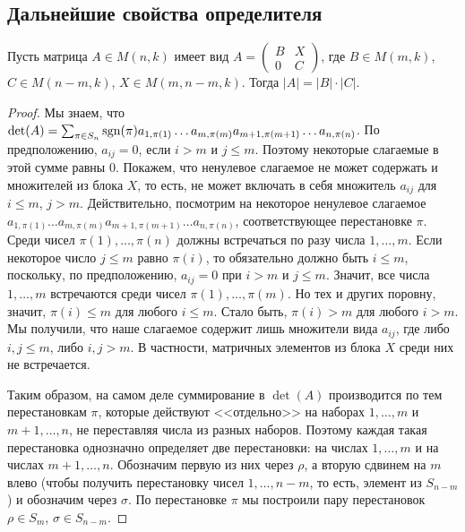 \subsection{Дальнейшие свойства определителя}

\begin{theorem}\label{thm_det_block_ut}
Пусть матрица $A\in M(n,k)$ имеет вид
$A=\begin{pmatrix}B & X\\0 & C\end{pmatrix}$, где
$B\in M(m,k)$, $C\in M(n-m,k)$, $X\in M(m,n-m,k)$. Тогда $|A|=|B|\cdot
|C|$.
\end{theorem}
\begin{proof}
Мы знаем, что $\det(A)=\sum_{\pi\in S_n}\operatorname{sgn}(\pi)a_{1,\pi(1)}\dots a_{m,\pi(m)}
a_{m+1,\pi(m+1)} \dots a_{n,\pi(n)}$.
По предположению, $a_{ij}=0$, если $i>m$ и $j\leq m$. Поэтому
некоторые слагаемые в этой сумме равны $0$. Покажем, что ненулевое
слагаемое не может содержать и множителей из блока $X$, то есть, не
может включать в себя множитель $a_{ij}$ для $i\leq m$, $j>m$.
Действительно, посмотрим на некоторое ненулевое слагаемое
$a_{1,\pi(1)}\dots a_{m,\pi(m)} a_{m+1,\pi(m+1)}\dots a_{n,\pi(n)}$,
соответствующее перестановке $\pi$.
Среди чисел $\pi(1),\dots,\pi(n)$ должны встречаться по разу числа
$1,\dots,m$. Если некоторое число $j\leq m$ равно $\pi(i)$, то
обязательно должно быть $i\leq m$, поскольку, по предположению,
$a_{ij}=0$ при $i>m$ и $j\leq m$. Значит, все числа $1,\dots,m$
встречаются среди чисел $\pi(1),\dots,\pi(m)$. Но тех и других
поровну, значит, $\pi(i)\leq m$ для любого $i\leq m$. Стало быть,
$\pi(i)>m$ для любого $i>m$. Мы получили, что наше слагаемое содержит
лишь множители вида $a_{ij}$, где либо $i,j\leq m$, либо $i,j>m$. В
частности, матричных элементов из блока $X$ среди них не встречается.

Таким образом, на самом деле суммирование в $\det(A)$ производится по
тем перестановкам $\pi$, которые действуют <<отдельно>> на наборах
$1,\dots,m$ и $m+1,\dots,n$, не переставляя числа из разных
наборов. Поэтому каждая такая перестановка однозначно определяет две
перестановки: на числах $1,\dots,m$ и на числах
$m+1,\dots,n$. Обозначим первую из них через $\rho$, а вторую сдвинем
на $m$ влево (чтобы получить перестановку чисел $1,\dots,n-m$, то
есть, элемент из $S_{n-m}$) и обозначим через $\sigma$. По
перестановке $\pi$ мы построили пару перестановок $\rho\in S_m$,
$\sigma\in S_{n-m}$.


\end{proof}
